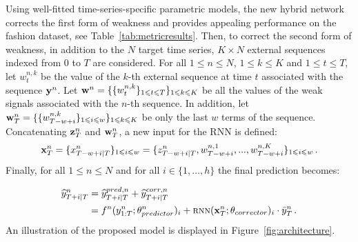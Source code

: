 \documentclass[review]{elsarticle}
\newcommand{\ts}{y}
\newcommand{\fullts}{{\bf \ts}}
\newcommand{\tspred}{\widehat{\ts}}
\newcommand{\stat}{f}
\newcommand{\statparam}{\theta_{predictor}}
\newcommand{\lag}{h}
\newcommand{\window}{w}
\newcommand{\meants}{\Bar{\ts}}
\newcommand{\rnnwindow}{{\bf \rnninput}}
\newcommand{\rnninput}{z}
\newcommand{\rnn}{\textsc{rnn}}
\newcommand{\rnnparam}{\theta_{corrector}}
\newcommand{\ws}{w}
\newcommand{\fullws}{{\bf \ws}}
\newcommand{\concatinput}{x}
\newcommand{\fullconcatinput}{{ \bf \concatinput}}
\begin{document}
Using well-fitted time-series-specific parametric models, the new hybrid network corrects the first form of weakness and provides appealing performance on the fashion dataset, see Table~\ref{tab:metricresults}. Then, to correct the second form of weakness, in addition to the $N$ target time series, $K \times N$ external sequences indexed from $0$ to $T$ are considered. For all $1\leqslant n \leqslant N$, $1\leqslant k \leqslant K$ and  $1\leqslant t \leqslant T$, let $\ws^{n,k}_t$ be the value of the $k$-th external sequence at time $t$ associated with the sequence $\fullts^n$. Let  $\fullws^n = \{\{\ws_t^{n,k}\}_{1\leqslant t \leqslant T}\}_{1\leqslant k \leqslant K}$ be all the values of the weak signals associated with the $n$-th sequence. In addition, let $\fullws^n_T = \{\{\ws_{T-w+i}^{n,k}\}_{1\leqslant i \leqslant \window}\}_{1\leqslant k \leqslant K}$ be only the last $\window$ terms of the sequence. Concatenating $ \rnnwindow^n_T$ and $\fullws^n_T$, a new input for the RNN is defined:   
$$
\fullconcatinput^n_T = \{\concatinput^n_{T-w+i|T}\}_{1\leqslant i \leqslant w}= \{\rnninput^n_{T-w+i|T}, \ws^{n,1}_{T-w+i},...,\ws^{n,K}_{T-w+i}\}_{1\leqslant i \leqslant w}\,.
$$
Finally, for all $1\leqslant n \leqslant N$ and for all $i \in \{1,\ldots,\lag\}$ the final prediction becomes:

\begin{align}
\label{eq:withws:full:model}
\tspred^n_{T+i|T}  &= \tspred^{pred,n}_{T+i|T} +  \tspred^{corr,n}_{T+i|T}\\
& = \stat^n(\ts^n_{1:T};\statparam^n)_i +  \rnn(\fullconcatinput^n_T;\rnnparam)_i \cdot \meants^n_T\,.\nonumber
\end{align}
An illustration of the proposed  model is displayed in Figure~\ref{fig:architecture}.
\end{document}
